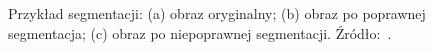 \begin{figure}[!ht]
 \begin{center}
 \end{center}
 \caption{
  Przykład segmentacji:
  (a) obraz oryginalny;
  (b) obraz po poprawnej segmentacja;
  (c) obraz po niepoprawnej segmentacji.
  Źródło:~\cite{anal:przet:obr}.
 }
 \label{fig:segmentation}
\end{figure}